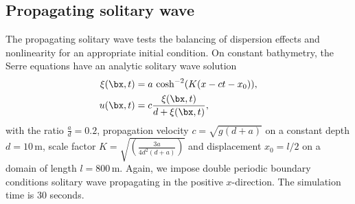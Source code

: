 \subsection{Propagating solitary wave}
The propagating solitary wave tests the balancing of dispersion effects and nonlinearity for an appropriate initial condition.
On constant bathymetry, the Serre equations \cite{Serre.1953} have an analytic solitary wave solution
\begin{align}
\label{eq:Serre_sol_surface}
\xi(\bx,t)&=a \ \text{cosh}^{-2}(K(x-ct-x_0)), \\
u(\bx,t)&=c\frac{\xi(\bx,t)}{d+\xi(\bx,t)},
\end{align}
with the ratio $\frac{a}{d}=0.2$, propagation velocity $c=\sqrt{g(d+a)}$ on a constant depth $d=10 \, \text{m}$, scale factor $K=\sqrt{\left(\frac{3a}{4d^2(d+a)}\right)}$ and displacement $x_0=l/2$ on a domain of length $l=800 \, \text{m}$.
Again, we impose double periodic boundary conditions solitary wave propagating in the positive $x$-direction. The simulation time is $30$ seconds.

